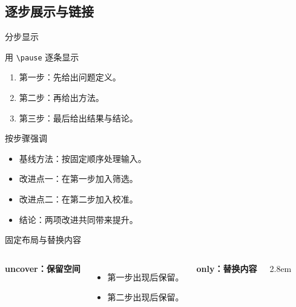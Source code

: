 \subsection{逐步展示与链接}
\begin{frame}{分步显示}
  \begin{exampleblock}{用 \texttt{\textbackslash pause} 逐条显示}
    \begin{enumerate}
      \item 第一步：先给出问题定义。
      \pause
      \item 第二步：再给出方法。
      \pause
      \item 第三步：最后给出结果与结论。
    \end{enumerate}
  \end{exampleblock}
\end{frame}

\begin{frame}{按步骤强调}
  \begin{itemize}
    \item 基线方法：按固定顺序处理输入。
    \item \alert<2>{改进点一}：在第一步加入筛选。
    \item \alert<3>{改进点二}：在第二步加入校准。
    \item \alert<4>{结论}：两项改进共同带来提升。
  \end{itemize}
\end{frame}

\begin{frame}[label=overlay-demo]{固定布局与替换内容}
  \begin{columns}[T,onlytextwidth]
      \textbf{uncover：保留空间}
      \begin{itemize}
        \item<1-> 第一步出现后保留。
        \item<2-> 第二步出现后保留。
      \end{itemize}
      \textbf{only：替换内容}
      \begin{overlayarea}{\linewidth}{2.8em}
      \end{overlayarea}
  \end{columns}
  \hyperlink{overlay-demo<1>}{}
\end{frame}
